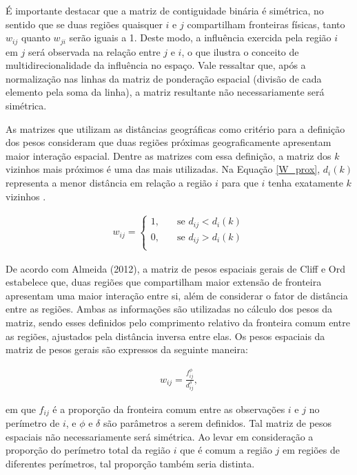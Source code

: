 \documentclass[12pt, a4paper,brazil,oneside]{article}
\begin{document}
	
	É importante destacar que a matriz de contiguidade binária é simétrica, no sentido que se duas regiões quaisquer $i$ e $j$ compartilham fronteiras físicas, tanto $w_{ij}$ quanto $w_{ji}$ serão iguais a 1. Deste modo, a influência exercida pela região $i$ em $j$ será observada na relação entre $j$ e $i$, o que ilustra o conceito de multidirecionalidade da influência no espaço. Vale ressaltar que, após a normalização nas linhas da matriz de ponderação espacial (divisão de cada elemento pela soma da linha), a matriz resultante não necessariamente será simétrica.
	
	
	As matrizes que utilizam as distâncias geográficas como critério para a definição dos pesos consideram que duas regiões próximas geograficamente apresentam maior interação espacial. Dentre as matrizes com essa definição, a matriz dos $k$ vizinhos mais próximos é uma das mais utilizadas. Na Equação \ref{W_prox}, $d_i(k)$ representa a menor distância em relação a região $i$ para que $i$ tenha exatamente $k$ vizinhos \cite{almeida12}.
	
	\begin{align}
	w_{ij} = 
	\begin{cases}
	\text{$1,$} & \quad\text{se $d_{ij} < d_i(k)$} \\
	\text{$0,$} & \quad\text{se $d_{ij} > d_i(k)$}\\
	\end{cases}
	\label{W_prox}
	\end{align}
	
	De acordo com Almeida (2012), a matriz de pesos espaciais gerais de Cliff e Ord  estabelece que, duas regiões que compartilham maior extensão de fronteira apresentam uma maior interação entre si, além de considerar o fator de distância entre as regiões. Ambas as informações são utilizadas no cálculo dos pesos da matriz, sendo esses definidos pelo comprimento relativo da fronteira comum entre as regiões, ajustados pela distância inversa entre elas. Os pesos espaciais da matriz de pesos gerais são expressos da seguinte maneira:
	
	\begin{align*}
	w_{ij} = \frac{f_{ij}^\phi}{d_{ij}^\delta},
	\end{align*}
	
	\noindent em que $f_{ij}$ é a proporção da fronteira comum entre as observações $i$ e $j$ no perímetro de $i$, e $\phi$ e $\delta$ são parâmetros a serem definidos. Tal matriz de pesos espaciais não necessariamente será simétrica. Ao levar em consideração a proporção do perímetro total da região $i$ que é comum a região $j$ em regiões de diferentes perímetros, tal proporção também seria distinta.
	
\end{document}
